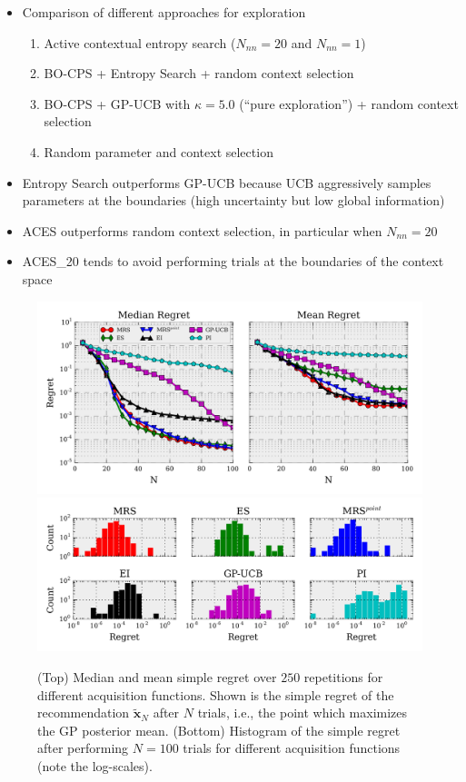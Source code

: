 \begin{block}{}
\begin{center}
\begin{itemize}
 \item Comparison of different approaches for exploration
 \begin{enumerate}
  \item Active contextual entropy search ($N_{nn} = 20$ and $N_{nn} = 1$)
  \item BO-CPS + Entropy Search +  random context selection
  \item BO-CPS + GP-UCB with $\kappa=5.0$ (``pure exploration'') + random context selection
  \item Random parameter and context selection
 \end{enumerate}
 \item Entropy Search outperforms GP-UCB because UCB aggressively samples parameters at the boundaries (high uncertainty but low global information)
 \item ACES outperforms random context selection, in particular when $N_{nn} = 20$
 \item ACES\_20 tends to avoid performing trials at the boundaries of the context space
\end{itemize}

\begin{figure}
\centering
\includegraphics[width=.9\columnwidth]{../pics/empirical_comparison} \\
\includegraphics[width=.9\columnwidth]{../pics/hist}
\caption{(Top) Median and mean simple regret over $250$ repetitions for different acquisition functions. Shown is the simple regret of the recommendation $\mathbf{\tilde x}_N$ after $N$ trials, i.e., the point which maximizes the GP posterior
mean. (Bottom) Histogram of the simple regret after performing $N=100$ trials for different acquisition functions (note the log-scales).}
\label{fig:empirical_comparison}
\end{figure}



\end{center}
\end{block}
